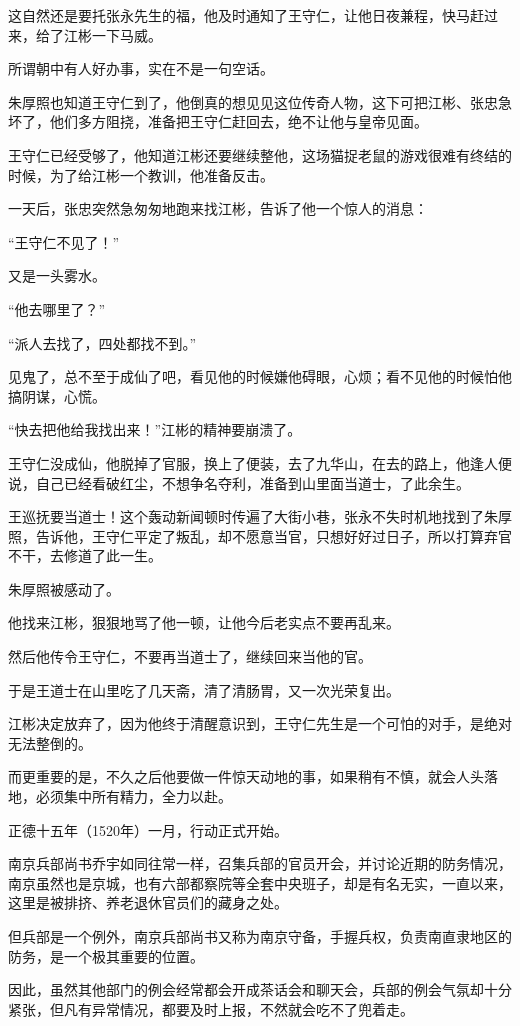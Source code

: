 \begin{multicols}{\theparacolNo}
		这自然还是要托张永先生的福，他及时通知了王守仁，让他日夜兼程，快马赶过来，给了江彬一下马威。

		所谓朝中有人好办事，实在不是一句空话。

		朱厚照也知道王守仁到了，他倒真的想见见这位传奇人物，这下可把江彬、张忠急坏了，他们多方阻挠，准备把王守仁赶回去，绝不让他与皇帝见面。

		王守仁已经受够了，他知道江彬还要继续整他，这场猫捉老鼠的游戏很难有终结的时候，为了给江彬一个教训，他准备反击。

		一天后，张忠突然急匆匆地跑来找江彬，告诉了他一个惊人的消息：

		“王守仁不见了！”

		又是一头雾水。

		“他去哪里了？”

		“派人去找了，四处都找不到。”

		见鬼了，总不至于成仙了吧，看见他的时候嫌他碍眼，心烦；看不见他的时候怕他搞阴谋，心慌。

		“快去把他给我找出来！”江彬的精神要崩溃了。

		王守仁没成仙，他脱掉了官服，换上了便装，去了九华山，在去的路上，他逢人便说，自己已经看破红尘，不想争名夺利，准备到山里面当道士，了此余生。

		王巡抚要当道士！这个轰动新闻顿时传遍了大街小巷，张永不失时机地找到了朱厚照，告诉他，王守仁平定了叛乱，却不愿意当官，只想好好过日子，所以打算弃官不干，去修道了此一生。

		朱厚照被感动了。

		他找来江彬，狠狠地骂了他一顿，让他今后老实点不要再乱来。

		然后他传令王守仁，不要再当道士了，继续回来当他的官。

		于是王道士在山里吃了几天斋，清了清肠胃，又一次光荣复出。

		江彬决定放弃了，因为他终于清醒意识到，王守仁先生是一个可怕的对手，是绝对无法整倒的。

		而更重要的是，不久之后他要做一件惊天动地的事，如果稍有不慎，就会人头落地，必须集中所有精力，全力以赴。

		正德十五年（1520年）一月，行动正式开始。

		南京兵部尚书乔宇如同往常一样，召集兵部的官员开会，并讨论近期的防务情况，南京虽然也是京城，也有六部都察院等全套中央班子，却是有名无实，一直以来，这里是被排挤、养老退休官员们的藏身之处。

		但兵部是一个例外，南京兵部尚书又称为南京守备，手握兵权，负责南直隶地区的防务，是一个极其重要的位置。

		因此，虽然其他部门的例会经常都会开成茶话会和聊天会，兵部的例会气氛却十分紧张，但凡有异常情况，都要及时上报，不然就会吃不了兜着走。


\end{multicols}

